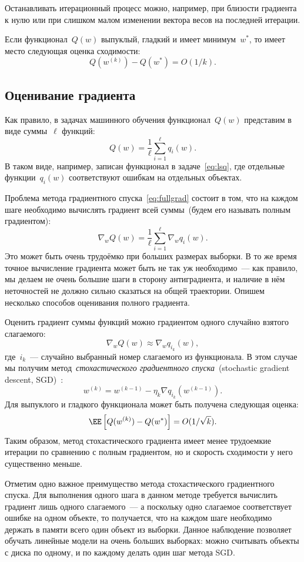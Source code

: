 \documentclass[12pt,fleqn]{article}
\begin{document}
Останавливать итерационный процесс можно, например, при близости градиента к нулю
или при слишком малом изменении вектора весов на последней итерации.

Если функционал~$Q(w)$ выпуклый, гладкий и имеет минимум~$w^*$,
то имеет место следующая оценка сходимости:
\[
    Q(w^{(k)}) - Q(w^*)
    =
    O(1 / k).
\]

\subsection{Оценивание градиента}

Как правило, в задачах машинного обучения функционал~$Q(w)$ представим в виде суммы~$\ell$ функций:
\[
    Q(w)
    =
    \frac{1}{\ell}
    \sum_{i = 1}^{\ell}
        q_i(w).
\]
В таком виде, например, записан функционал в задаче~\eqref{eq:lsq},
где отдельные функции~$q_i(w)$ соответствуют ошибкам на отдельных объектах.

Проблема метода градиентного спуска~\eqref{eq:fullgrad} состоит в том,
что на каждом шаге необходимо вычислять градиент всей суммы~(будем его называть полным градиентом):
\[
    \nabla_w Q(w)
    =
    \frac{1}{\ell}
    \sum_{i = 1}^{\ell}
        \nabla_w q_i(w).
\]
Это может быть очень трудоёмко при больших размерах выборки.
В то же время точное вычисление градиента может быть не так уж необходимо~---
как правило, мы делаем не очень большие шаги в сторону антиградиента,
и наличие в нём неточностей не должно сильно сказаться на общей траектории.
Опишем несколько способов оценивания полного градиента.

Оценить градиент суммы функций можно градиентом одного случайно взятого слагаемого:
\[
    \nabla_w Q(w)
    \approx
    \nabla_w q_{i_k}(w),
\]
где~$i_k$~--- случайно выбранный номер слагаемого из функционала.
В этом случае мы получим метод~\emph{стохастического
градиентного спуска}~(stochastic gradient descent, SGD)~\cite{robbins51stochastic}:
\[
    w^{(k)} = w^{(k - 1)} - \eta_k \nabla q_{i_k}(w^{(k - 1)}).
\]
Для выпуклого и гладкого функционала может быть получена
следующая оценка:
\[
    \EE \left[
        Q(w^{(k)}) - Q(w^*)
    \right]
    =
    O(1 / \sqrt{k}).
\]
Таким образом, метод стохастического градиента имеет менее
трудоемкие итерации по сравнению с полным градиентом,
но и скорость сходимости у него существенно меньше.

Отметим одно важное преимущество метода стохастического градиентного спуска.
Для выполнения одного шага в данном методе требуется вычислить градиент лишь одного слагаемого~---
а поскольку одно слагаемое соответствует ошибке на одном объекте,
то получается, что на каждом шаге необходимо держать в памяти всего один объект из выборки.
Данное наблюдение позволяет обучать линейные модели на очень больших выборках:
можно считывать объекты с диска по одному, и по каждому делать один шаг метода SGD.
\end{document}
